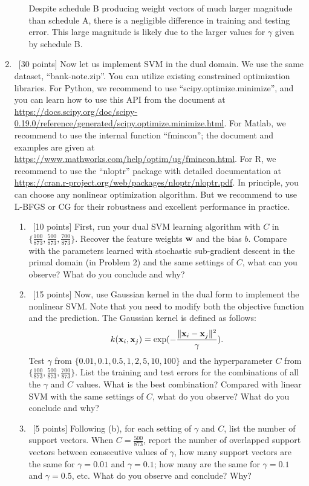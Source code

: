 \documentclass[12pt, fullpage,letterpaper]{article}
\begin{document}
\begin{enumerate}
\begin{enumerate}
		Despite schedule B producing weight vectors of much larger magnitude than schedule A, there is a negligible difference in training and testing error. This large magnitude is likely due to the larger values for $\gamma$ given by schedule B.
	
	\end{enumerate}


\item~[30 points] Now let us implement SVM in the dual domain. We use the same dataset, ``bank-note.zip''. You can utilize existing constrained optimization libraries. For Python, we recommend to use ``scipy.optimize.minimize'', and you can learn how to use this API from the document at \url{https://docs.scipy.org/doc/scipy-0.19.0/reference/generated/scipy.optimize.minimize.html}.
For Matlab, we recommend to use the internal function ``fmincon''; the document and examples are given at \url{https://www.mathworks.com/help/optim/ug/fmincon.html}. For R, we recommend to use the ``nloptr'' package with detailed documentation at \url{https://cran.r-project.org/web/packages/nloptr/nloptr.pdf}. In principle, you can choose any nonlinear optimization algorithm. But we recommend to use L-BFGS or CG for their robustness and excellent performance in practice. 

\begin{enumerate}
	\item ~[10 points] First, run your dual SVM learning algorithm with   $C$ in $\{\frac{100}{873}, \frac{500}{873}, \frac{700}{873}\}$. Recover the feature weights ${\bf w}$ and the bias $b$. Compare with the parameters learned with stochastic sub-gradient descent in the primal domain (in Problem 2) and the same settings of $C$, what can you observe? What do you conclude and why?
	
	\item~[15 points] Now, use Gaussian kernel in the dual form to implement the nonlinear SVM. Note that you need to modify both the objective function and the prediction. The Gaussian kernel is defined as follows:
	\[
	k({\bf x}_i, {\bf x}_j) = \exp(-\frac{\|{\bf x}_i - {\bf x}_j\|^2}{\gamma}).
	\]
	Test $\gamma$ from $\{0.01, 0.1, 0.5, 1, 2, 5, 10, 100\}$ and the hyperparameter $C$ from $\{ \frac{100}{873}, \frac{500}{873},  \frac{700}{873}\}$. List the training and test errors for the combinations of all the $\gamma$ and $C$ values. What is the best combination? Compared with linear SVM with the same settings of $C$, what do you observe? What do you conclude and why?  
	
	\item~[5 points] Following (b), for each setting of $\gamma$ and $C$, list the number of support vectors. When $C = \frac{500}{873}$, report the number of overlapped support vectors between consecutive values of $\gamma$, \ie how many support vectors are the same for $\gamma= 0.01$ and $\gamma = 0.1$; how many are the same for  $\gamma = 0.1$ and $\gamma = 0.5$, etc. What do you observe and conclude? Why?
	

\end{enumerate}
\end{enumerate}
\end{document}
